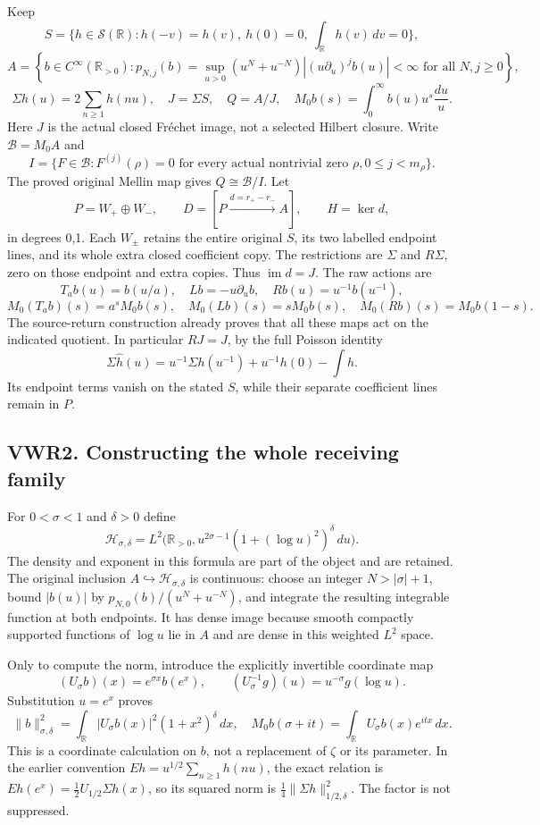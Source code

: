 Keep \[
S=\{h\in\mathcal S(\mathbb R):h(-v)=h(v),\ h(0)=0,\ \int_{\mathbb R}h(v)\,dv=0\},
\] \[
A=\left\{b\in C^\infty(\mathbb R_{>0}):
 p_{N,j}(b)=\sup_{u>0}(u^N+u^{-N})|(u\partial_u)^jb(u)|<\infty
 \text{ for all }N,j\ge0\right\},
\] \[
\Sigma h(u)=2\sum_{n\ge1}h(nu),\quad J=\Sigma S,\quad Q=A/J,
\quad M_0b(s)=\int_0^\infty b(u)u^s\frac{du}{u}.
\tag{VWR1.1}
\] Here \(J\) is the actual closed Fréchet image, not a selected Hilbert
closure. Write \(\mathcal B=M_0A\) and \[
I=\{F\in\mathcal B:F^{(j)}(\rho)=0\text{ for every actual nontrivial zero }\rho,
 0\le j<m_\rho\}.
\] The proved original Mellin map gives \(Q\cong\mathcal B/I\). Let \[
P=W_+\oplus W_-,\qquad D=[P\xrightarrow{d=r_+-r_-}A],\qquad H=\ker d,
\tag{VWR1.2}
\] in degrees 0,1. Each \(W_\pm\) retains the entire original \(S\), its
two labelled endpoint lines, and its whole extra closed coefficient
copy. The restrictions are \(\Sigma\) and \(R\Sigma\), zero on those
endpoint and extra copies. Thus \(\operatorname{im}d=J\). The raw
actions are \[
T_ab(u)=b(u/a),\quad Lb=-u\partial_ub,\quad Rb(u)=u^{-1}b(u^{-1}),
\] \[
M_0(T_ab)(s)=a^sM_0b(s),\quad M_0(Lb)(s)=sM_0b(s),\quad
M_0(Rb)(s)=M_0b(1-s).
\tag{VWR1.3}
\] The source-return construction already proves that all these maps act
on the indicated quotient. In particular \(RJ=J\), by the full Poisson
identity \[
\Sigma\widehat h(u)=u^{-1}\Sigma h(u^{-1})+u^{-1}h(0)-\int h.
\tag{VWR1.4}
\] Its endpoint terms vanish on the stated \(S\), while their separate
coefficient lines remain in \(P\).

\subsection{VWR2. Constructing the whole receiving
family}\label{vwr2.-constructing-the-whole-receiving-family}

For \(0<\sigma<1\) and \(\delta>0\) define \[
\mathcal H_{\sigma,\delta}
=L^2\bigl(\mathbb R_{>0},u^{2\sigma-1}(1+(\log u)^2)^\delta\,du\bigr).
\tag{VWR2.1}
\] The density and exponent in this formula are part of the object and
are retained. The original inclusion
\(A\hookrightarrow\mathcal H_{\sigma,\delta}\) is continuous: choose an
integer \(N>|\sigma|+1\), bound \(|b(u)|\) by
\(p_{N,0}(b)/(u^N+u^{-N})\), and integrate the resulting integrable
function at both endpoints. It has dense image because smooth compactly
supported functions of \(\log u\) lie in \(A\) and are dense in this
weighted \(L^2\) space.

Only to compute the norm, introduce the explicitly invertible coordinate
map \[
(U_\sigma b)(x)=e^{\sigma x}b(e^x),\qquad
(U_\sigma^{-1}g)(u)=u^{-\sigma}g(\log u).
\] Substitution \(u=e^x\) proves \[
\|b\|_{\sigma,\delta}^2
=\int_{\mathbb R}|U_\sigma b(x)|^2(1+x^2)^\delta\,dx,
\quad
M_0b(\sigma+it)=\int_{\mathbb R}U_\sigma b(x)e^{itx}\,dx.
\tag{VWR2.2}
\] This is a coordinate calculation on \(b\), not a replacement of
\(\zeta\) or its parameter. In the earlier convention
\(Eh=u^{1/2}\sum_{n\ge1}h(nu)\), the exact relation is
\(E h(e^x)=\tfrac12U_{1/2}\Sigma h(x)\), so its squared norm is
\(\tfrac14\|\Sigma h\|_{1/2,\delta}^2\). The factor is not suppressed.

